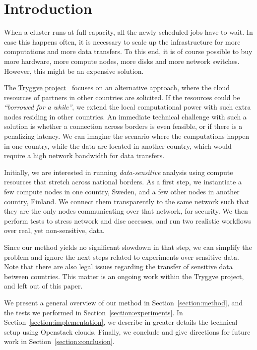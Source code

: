 \section{Introduction}
\label{section:intro}

When a cluster runs at full capacity, all the newly scheduled jobs
have to wait. In case this happens often, it is necessary to scale up
the infrastructure for more computations and more data transfers. To
this end, it is of course possible to buy more hardware, \ie more
compute nodes, more disks and more network switches. However, this
might be an expensive solution.

The \href{https://wiki.neic.no/wiki/Tryggve}{Tryggve
  project}~\cite{tryggve} focuses %
on an alternative approach, where the cloud resources of partners in
other countries are solicited.
%
If the resources could be \emph{``borrowed for a while''}, we extend
the local computational power with such extra nodes residing in other
countries.
%
An immediate technical challenge with such a solution is whether a
connection across borders is even feasible, or if there is a
penalizing latency. We can imagine the scenario where the computations
happen in one country, while the data are located in another country,
which would require a high network bandwidth for data transfers.

Initially, we are interested in running \emph{data-sensitive} analysis
using compute resources that stretch across national borders.
%
As a first step, we instantiate a few compute nodes in one country,
Sweden, and a few other nodes in another country, Finland. We connect
them transparently to the same network such that they are the only
nodes communicating over that network, for security. We then perform
tests to stress network and disc accesses, and run two realistic
workflows over real, yet non-sensitive, data.

Since our method yields no significant slowdown in that step, we
can simplify the problem and ignore the next steps related to
experiments over sensitive data.
%
Note that there are also legal issues regarding the transfer of
sensitive data between countries. This matter is an ongoing work
within the Tryggve project, and left out of this paper.

We present a general overview of our method in
Section~\ref{section:method}, and the tests we performed in
Section~\ref{section:experiments}.
%
In Section~\ref{section:implementation}, we describe in greater
details the technical setup using Openstack clouds.
%
Finally, we conclude and give directions for future work in
Section~\ref{section:conclusion}.
